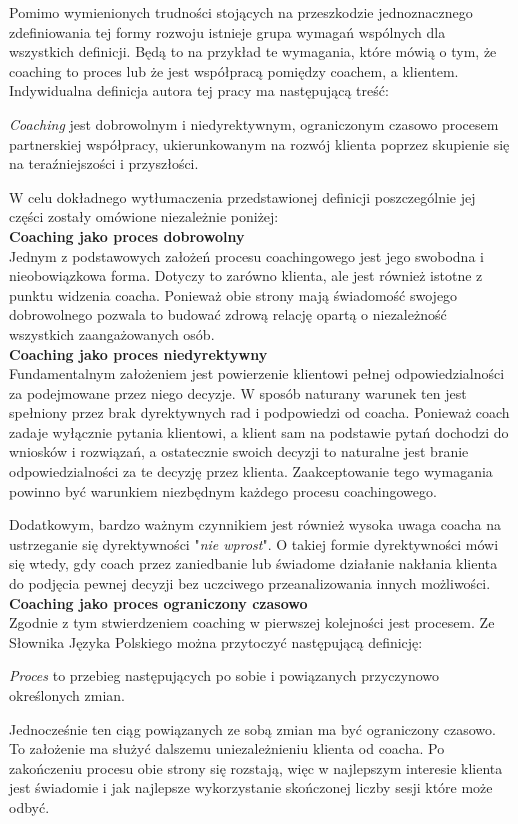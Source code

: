 Pomimo wymienionych trudności stojących na przeszkodzie jednoznacznego zdefiniowania tej formy rozwoju istnieje grupa wymagań wspólnych dla
wszystkich definicji. Będą to na przykład te wymagania, które mówią o tym, że coaching to proces lub że jest współpracą pomiędzy
coachem, a klientem. Indywidualna definicja autora tej pracy ma następującą treść:
\begin{defn}
  \emph{Coaching} jest dobrowolnym i niedyrektywnym, ograniczonym czasowo procesem partnerskiej współpracy,
  ukierunkowanym na rozwój klienta poprzez skupienie się na teraźniejszości i przyszłości.
  \label{definicja}
\end{defn}

W celu dokładnego wytłumaczenia przedstawionej definicji poszczególnie jej części zostały omówione niezależnie poniżej: \\

\textbf{Coaching jako proces dobrowolny} \\
Jednym z podstawowych założeń procesu coachingowego jest jego swobodna i nieobowiązkowa forma. Dotyczy to zarówno klienta, ale jest
również istotne z punktu widzenia coacha. Ponieważ obie strony mają świadomość swojego dobrowolnego pozwala to budować
zdrową relację opartą o niezależność wszystkich zaangażowanych osób. \\

\textbf{Coaching jako proces niedyrektywny} \\
Fundamentalnym założeniem jest powierzenie klientowi pełnej odpowiedzialności za podejmowane przez niego decyzje. W sposób naturany
warunek ten jest spełniony przez brak dyrektywnych rad i podpowiedzi od coacha. Ponieważ coach zadaje wyłącznie pytania klientowi,
a klient sam na podstawie pytań dochodzi do wniosków i rozwiązań, a ostatecznie swoich decyzji to naturalne jest branie odpowiedzialności
za te decyzję przez klienta. Zaakceptowanie tego wymagania powinno być warunkiem niezbędnym każdego procesu coachingowego.

Dodatkowym, bardzo ważnym czynnikiem jest również wysoka uwaga coacha na ustrzeganie się dyrektywności "\emph{nie wprost}". O takiej formie
dyrektywności mówi się wtedy, gdy coach przez zaniedbanie lub świadome działanie nakłania klienta do podjęcia pewnej decyzji bez uczciwego przeanalizowania
innych możliwości. \\

\textbf{Coaching jako proces ograniczony czasowo} \\
Zgodnie z tym stwierdzeniem coaching w pierwszej kolejności jest procesem. Ze Słownika Języka Polskiego można przytoczyć następującą definicję:
\begin{defn}
\emph{Proces} to przebieg następujących po sobie i powiązanych przyczynowo określonych zmian.
\end{defn}
Jednocześnie ten ciąg powiązanych ze sobą zmian ma być ograniczony czasowo. To założenie ma służyć dalszemu uniezależnieniu klienta
od coacha. Po zakończeniu procesu obie strony się rozstają, więc w najlepszym interesie klienta jest świadomie i jak najlepsze wykorzystanie
skończonej liczby sesji które może odbyć.

